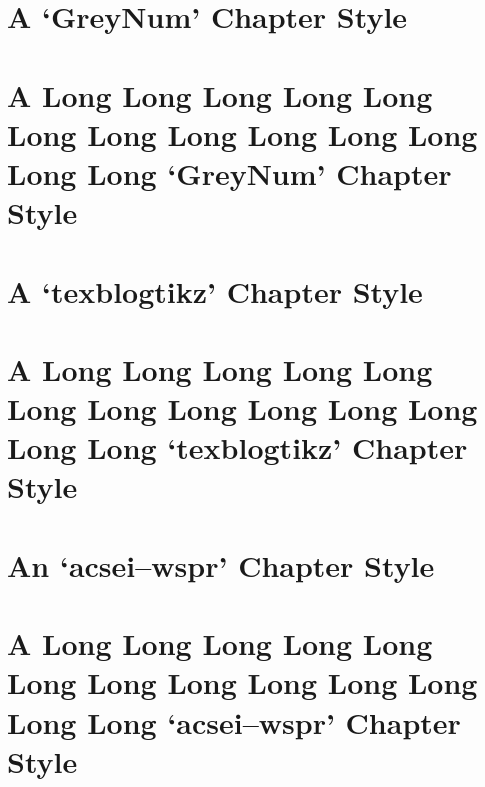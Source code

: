 \documentclass[10pt,a4paper,extrafontsizes,oldfontcommands,oneside]{memoir}
\begin{document}


\chapter{A `GreyNum' Chapter Style} %
\label{chap:a_GreyNum_chapter_style}



\chapter{A Long Long Long Long Long Long Long Long Long Long Long Long Long `GreyNum' Chapter Style} %
\label{chap:a_long_GreyNum_chapter_style}



\chapter{A `texblogtikz' Chapter Style} %
\label{chap:a_texblogtikz_chapter_style}



\chapter{A Long Long Long Long Long Long Long Long Long Long Long Long Long `texblogtikz' Chapter Style} %
\label{chap:a_long_texblogtikz_chapter_style}



\chapter{An `acsei--wspr' Chapter Style} %
\label{chap:a_acsei_chapter_style}



\chapter{A Long Long Long Long Long Long Long Long Long Long Long Long Long `acsei--wspr' Chapter Style} %
\label{chap:a_long_acsei_chapter_style}

\end{document}
